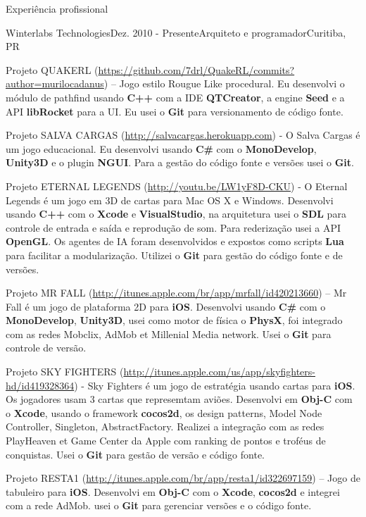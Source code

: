 \documentclass{resume}
\begin{document}
\begin{rSection}{Experiência profissional}
\begin{rSubsection}{Winterlabs Technologies}{Dez. 2010 - Presente}{Arquiteto e programador}{Curitiba, PR}
    \item Projeto QUAKERL (\url{https://github.com/7drl/QuakeRL/commits?author=murilocadanus}) – Jogo estilo Rougue Like procedural. Eu desenvolvi o módulo de pathfind usando \textbf{C++} com a IDE \textbf{QTCreator}, a engine \textbf{Seed} e a API \textbf{libRocket} para a UI.  Eu usei o \textbf{Git} para versionamento de código fonte. \\
    \item Projeto SALVA CARGAS (\url{http://salvacargas.herokuapp.com}) - O Salva Cargas é um jogo educacional. Eu desenvolvi usando \textbf{C\#} com o \textbf{MonoDevelop}, \textbf{Unity3D} e o plugin \textbf{NGUI}. Para a gestão do código fonte e versões usei o \textbf{Git}. \\
    \item Projeto ETERNAL LEGENDS (\url{http://youtu.be/LW1yF8D-CKU}) - O Eternal Legends é um jogo em 3D de cartas para Mac OS X e Windows. Desenvolvi usando \textbf{C++} com o \textbf{Xcode} e \textbf{VisualStudio}, na arquitetura usei o \textbf{SDL} para controle de entrada e saída e reprodução de som. Para rederização usei a API \textbf{OpenGL}. Os agentes de IA foram desenvolvidos e expostos como scripts \textbf{Lua} para facilitar a modularização. Utilizei o \textbf{Git} para gestão do código fonte e de versões. \\
    \item Projeto MR FALL (\url{http://itunes.apple.com/br/app/mrfall/id420213660}) – Mr Fall é um jogo de plataforma 2D para \textbf{iOS}. Desenvolvi usando \textbf{C\#} com o \textbf{MonoDevelop}, \textbf{Unity3D}, usei como motor de física o \textbf{PhysX}, foi integrado com as redes Mobclix, AdMob et Millenial Media network. Usei o \textbf{Git} para controle de versão. \\
    \item Projeto SKY FIGHTERS (\url{http://itunes.apple.com/us/app/skyfighters-hd/id419328364}) - Sky Fighters é um jogo de estratégia usando cartas para \textbf{iOS}. Os jogadores usam 3 cartas que represemtam aviões. Desenvolvi em \textbf{Obj-C} com o \textbf{Xcode}, usando o framework \textbf{cocos2d}, os design patterns, Model Node Controller, Singleton, AbstractFactory. Realizei a integração com as redes PlayHeaven et Game Center da Apple com ranking de pontos e troféus de conquistas. Usei o \textbf{Git} para gestão de versão e código fonte. \\
    \item Projeto RESTA1 (\url{http://itunes.apple.com/br/app/resta1/id322697159}) – Jogo de tabuleiro para \textbf{iOS}. Desenvolvi em \textbf{Obj-C} com o \textbf{Xcode}, \textbf{cocos2d} e integrei com a rede AdMob. usei o \textbf{Git} para gerenciar versões e o código fonte.

\end{rSubsection}
\end{rSection}
\end{document}
